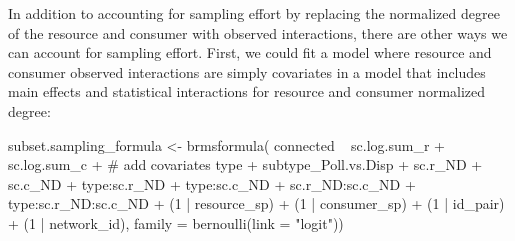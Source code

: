 \documentclass[11pt,]{article}
\newenvironment{Shaded}{}{}
\newcommand{\KeywordTok}[1]{\textcolor[rgb]{0.00,0.00,1.00}{#1}}
\newcommand{\DataTypeTok}[1]{#1}
\newcommand{\DecValTok}[1]{#1}
\newcommand{\StringTok}[1]{\textcolor[rgb]{0.00,0.50,0.50}{#1}}
\newcommand{\CommentTok}[1]{\textcolor[rgb]{0.00,0.50,0.00}{#1}}
\newcommand{\OperatorTok}[1]{#1}
\newcommand{\NormalTok}[1]{#1}
\begin{document}
In addition to accounting for sampling effort by replacing the
normalized degree of the resource and consumer with observed
interactions, there are other ways we can account for sampling effort.
First, we could fit a model where resource and consumer observed
interactions are simply covariates in a model that includes main effects
and statistical interactions for resource and consumer normalized
degree:

\begin{Shaded}
\begin{Highlighting}[]
\NormalTok{subset.sampling_formula <-}\StringTok{ }\KeywordTok{brmsformula}\NormalTok{(}
\NormalTok{  connected }\OperatorTok{~}\StringTok{ }\NormalTok{sc.log.sum_r }\OperatorTok{+}\StringTok{ }\NormalTok{sc.log.sum_c }\OperatorTok{+}\StringTok{ }\CommentTok{# add covariates}
\StringTok{    }\NormalTok{type }\OperatorTok{+}\StringTok{ }\NormalTok{subtype_Poll.vs.Disp }\OperatorTok{+}\StringTok{ }\NormalTok{sc.r_ND }\OperatorTok{+}\StringTok{ }\NormalTok{sc.c_ND }\OperatorTok{+}
\StringTok{    }\NormalTok{type}\OperatorTok{:}\NormalTok{sc.r_ND }\OperatorTok{+}\StringTok{ }\NormalTok{type}\OperatorTok{:}\NormalTok{sc.c_ND }\OperatorTok{+}\StringTok{ }\NormalTok{sc.r_ND}\OperatorTok{:}\NormalTok{sc.c_ND }\OperatorTok{+}
\StringTok{    }\NormalTok{type}\OperatorTok{:}\NormalTok{sc.r_ND}\OperatorTok{:}\NormalTok{sc.c_ND }\OperatorTok{+}
\StringTok{    }\NormalTok{(}\DecValTok{1} \OperatorTok{|}\StringTok{ }\NormalTok{resource_sp) }\OperatorTok{+}\StringTok{ }\NormalTok{(}\DecValTok{1} \OperatorTok{|}\StringTok{ }\NormalTok{consumer_sp) }\OperatorTok{+}\StringTok{ }\NormalTok{(}\DecValTok{1} \OperatorTok{|}\StringTok{ }\NormalTok{id_pair) }\OperatorTok{+}\StringTok{ }\NormalTok{(}\DecValTok{1} \OperatorTok{|}\StringTok{ }\NormalTok{network_id),}
  \DataTypeTok{family =} \KeywordTok{bernoulli}\NormalTok{(}\DataTypeTok{link =} \StringTok{"logit"}\NormalTok{))}


\end{Highlighting}
\end{Shaded}
\end{document}
